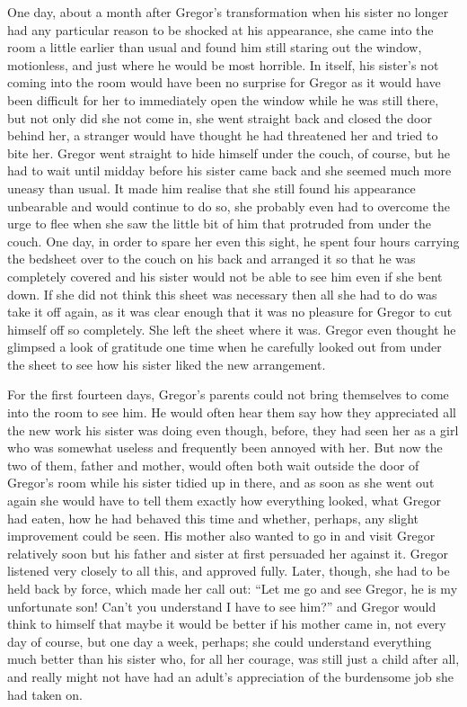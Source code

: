 \documentclass[12pt]{report}
\begin{document}
One day, about a month after Gregor's transformation when his sister no
longer had any particular reason to be shocked at his appearance, she
came into the room a little earlier than usual and found him still
staring out the window, motionless, and just where he would be most
horrible. In itself, his sister's not coming into the room would have
been no surprise for Gregor as it would have been difficult for her to
immediately open the window while he was still there, but not only did
she not come in, she went straight back and closed the door behind her,
a stranger would have thought he had threatened her and tried to bite
her. Gregor went straight to hide himself under the couch, of course,
but he had to wait until midday before his sister came back and she
seemed much more uneasy than usual. It made him realise that she still
found his appearance unbearable and would continue to do so, she
probably even had to overcome the urge to flee when she saw the little
bit of him that protruded from under the couch. One day, in order to
spare her even this sight, he spent four hours carrying the bedsheet
over to the couch on his back and arranged it so that he was completely
covered and his sister would not be able to see him even if she bent
down. If she did not think this sheet was necessary then all she had to
do was take it off again, as it was clear enough that it was no pleasure
for Gregor to cut himself off so completely. She left the sheet where it
was. Gregor even thought he glimpsed a look of gratitude one time when
he carefully looked out from under the sheet to see how his sister liked
the new arrangement.

For the first fourteen days, Gregor's parents could not bring themselves
to come into the room to see him. He would often hear them say how they
appreciated all the new work his sister was doing even though, before,
they had seen her as a girl who was somewhat useless and frequently been
annoyed with her. But now the two of them, father and mother, would
often both wait outside the door of Gregor's room while his sister
tidied up in there, and as soon as she went out again she would have to
tell them exactly how everything looked, what Gregor had eaten, how he
had behaved this time and whether, perhaps, any slight improvement could
be seen. His mother also wanted to go in and visit Gregor relatively
soon but his father and sister at first persuaded her against it. Gregor
listened very closely to all this, and approved fully. Later, though,
she had to be held back by force, which made her call out: ``Let me go
and see Gregor, he is my unfortunate son! Can't you understand I have to
see him?'' and Gregor would think to himself that maybe it would be
better if his mother came in, not every day of course, but one day a
week, perhaps; she could understand everything much better than his
sister who, for all her courage, was still just a child after all, and
really might not have had an adult's appreciation of the burdensome job
she had taken on.
\end{document}
